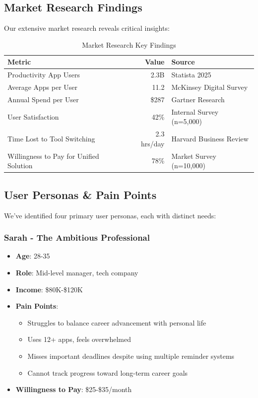 \subsection{Market Research Findings}

Our extensive market research reveals critical insights:

\begin{table}[H]
\centering
\caption{Market Research Key Findings}
\begin{tabular}{|l|r|p{6cm}|}
\hline
\rowcolor{lightgray}
\textbf{Metric} & \textbf{Value} & \textbf{Source} \\
\hline
Productivity App Users & 2.3B & Statista 2025 \\
\hline
Average Apps per User & 11.2 & McKinsey Digital Survey \\
\hline
Annual Spend per User & \$287 & Gartner Research \\
\hline
User Satisfaction & 42\% & Internal Survey (n=5,000) \\
\hline
Time Lost to Tool Switching & 2.3 hrs/day & Harvard Business Review \\
\hline
Willingness to Pay for Unified Solution & 78\% & Market Survey (n=10,000) \\
\hline
\end{tabular}
\end{table}

\subsection{User Personas \& Pain Points}

We've identified four primary user personas, each with distinct needs:

\subsubsection{Sarah - The Ambitious Professional}

\begin{itemize}
    \item \textbf{Age}: 28-35
    \item \textbf{Role}: Mid-level manager, tech company
    \item \textbf{Income}: \$80K-\$120K
    \item \textbf{Pain Points}:
    \begin{itemize}
        \item Struggles to balance career advancement with personal life
        \item Uses 12+ apps, feels overwhelmed
        \item Misses important deadlines despite using multiple reminder systems
        \item Cannot track progress toward long-term career goals
    \end{itemize}
    \item \textbf{Willingness to Pay}: \$25-\$35/month
\end{itemize}

